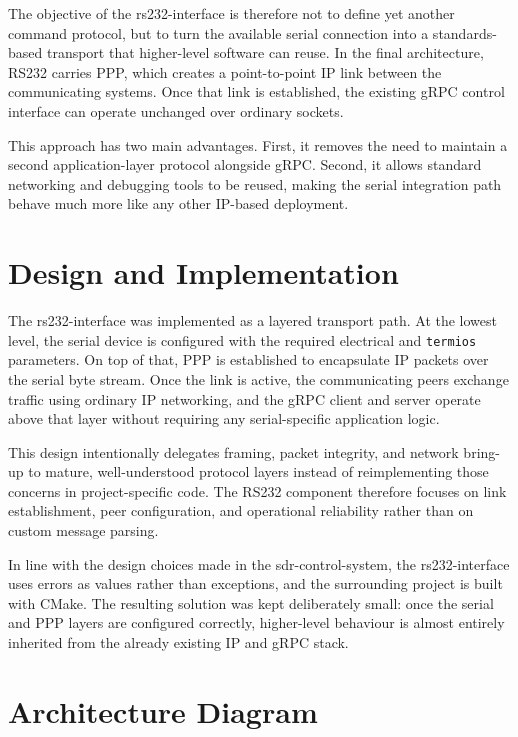 The objective of the \gls{rs232-interface} is therefore not to define yet
another command protocol, but to turn the available serial connection into a
standards-based transport that higher-level software can reuse. In the final
architecture, \gls{RS232} carries \gls{PPP}, which creates a point-to-point IP
link between the communicating systems. Once that link is established, the
existing gRPC control interface can operate unchanged over ordinary sockets.

This approach has two main advantages. First, it removes the need to maintain
a second application-layer protocol alongside gRPC. Second, it allows standard
networking and debugging tools to be reused, making the serial integration path
behave much more like any other IP-based deployment.

\section{Design and Implementation}

The \gls{rs232-interface} was implemented as a layered transport path. At the
lowest level, the serial device is configured with the required electrical and
\texttt{termios} parameters. On top of that, \gls{PPP} is established to
encapsulate IP packets over the serial byte stream. Once the link is active,
the communicating peers exchange traffic using ordinary IP networking, and the
gRPC client and server operate above that layer without requiring any
serial-specific application logic.

This design intentionally delegates framing, packet integrity, and network
bring-up to mature, well-understood protocol layers instead of reimplementing
those concerns in project-specific code. The \gls{RS232} component therefore
focuses on link establishment, peer configuration, and operational reliability
rather than on custom message parsing.

In line with the design choices made in the \gls{sdr-control-system}, the
\gls{rs232-interface} uses errors as values rather than exceptions, and the
surrounding project is built with CMake.\cite{cmake} The resulting solution was
kept deliberately small: once the serial and \gls{PPP} layers are configured
correctly, higher-level behaviour is almost entirely inherited from the already
existing IP and gRPC stack.

\section{Architecture Diagram}


